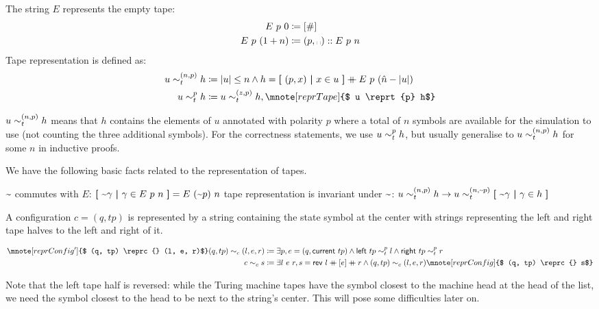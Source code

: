 \begin{definition}
  The string $E$ represents the empty tape: 
  \begin{align*}
    \nilstr{p}{0} &\defeq [\#] \\
    \nilstr{p}{(\natS{n})} &\defeq (p, \blank) :: \nilstr{p}{n}
  \end{align*}
  Tape representation is defined as:
  \begin{align*}
    u \reprtt{n}{p} h &\defeq \length{u} \le n \land h = \withl(p, x) \withm x \in u\withr \concat \nilstr{p}{(\hat{n} - \length{u})}\\
    u \reprt{p} h &\defeq u \reprtt{z}{p} h, \mnote[reprTape]{$ u \reprt{p} h$}
  \end{align*}
\end{definition}
$u \sim_t^{(n, p)} h$ means that $h$ contains the elements of $u$ annotated with polarity $p$ where a total of $n$ symbols are available for the simulation to use (not counting the three additional symbols).
For the correctness statements, we use $u \sim_t^{p} h$, but usually generalise to $u \sim_t^{(n, p)} h$ for some $n$ in inductive proofs. 

\begin{proposition}\label{prop:tapefacts}\leavevmode
  We have the following basic facts related to the representation of tapes.
  \begin{enumerate}
    \coqitem[E_polarityFlip] $\text{\textasciitilde}$ commutes with $E$: $\textbf{[}~ \text{\textasciitilde}\gamma ~\textbf{|}~ \gamma \in E~p~n ~\textbf{]} = E~(\text{\textasciitilde}p)~n$
     tape representation is invariant under $\text{\textasciitilde}$: $u \sim_t^{(n, p)} h \rightarrow u \sim_t^{(n, \text{\textasciitilde}p)} \textbf{[}~ \text{\textasciitilde}\gamma ~\textbf{|}~ \gamma \in h ~\textbf{]}$
  \end{enumerate}
\end{proposition}

A configuration $c = (q, tp)$ is represented by a string containing the state symbol at the center with strings representing the left and right tape halves to the left and right of it. 
\begin{definition}
  \begin{align*}
    \mnote[reprConfig']{$ (q, tp) \reprc{} (l, e, r)$}
    (q, tp) \reprc{} (l, e, r) &\defeq \exists p, e = (q, \tmcurrent{tp}) \land \tmleft{tp} \reprt{p} l \land \tmright{tp} \reprt{p} r \\
    c \reprc{} s &\defeq \exists l~ e~ r, s = \rev~{l} \concat{} [e] \concat{} r \land (q, tp) \reprc{} (l, e, r) \mnote[reprConfig]{$ (q, tp) \reprc{} s$}
  \end{align*}
\end{definition}
Note that the left tape half is reversed: while the Turing machine tapes have the symbol closest to the machine head at the head of the list, we need the symbol closest to the head to be next to the string's center. This will pose some difficulties later on.

